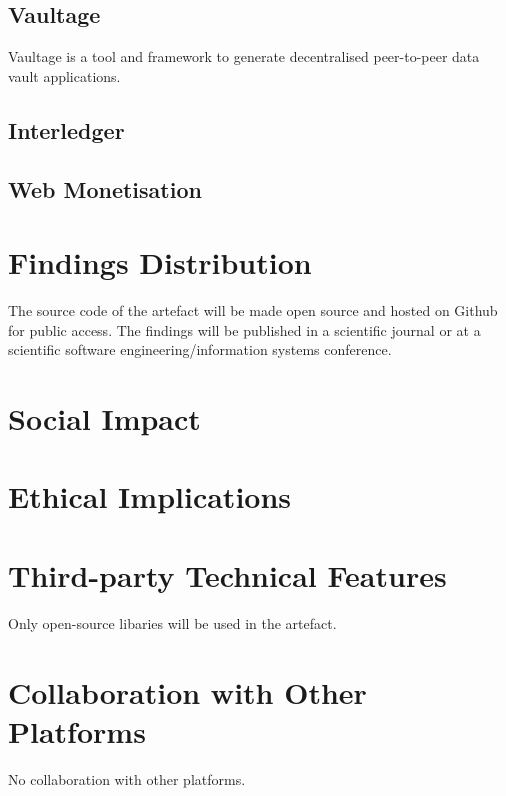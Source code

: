 \documentclass[]{report}
\begin{document}
\subsection{Vaultage}
Vaultage is a tool and framework to generate decentralised peer-to-peer data vault applications. 

\subsection{Interledger}

\subsection{Web Monetisation}

\section{Findings Distribution}
The source code of the artefact will be made open source and hosted on Github for public access. The findings will be published in a scientific journal or at a scientific software engineering/information systems conference.  

\section{Social Impact}

\section{Ethical Implications}

\section{Third-party Technical Features}
Only open-source libaries will be used in the artefact.  

\section{Collaboration with Other Platforms}
No collaboration with other platforms.

 


%
%
%
%
%
%
%
\end{document}

